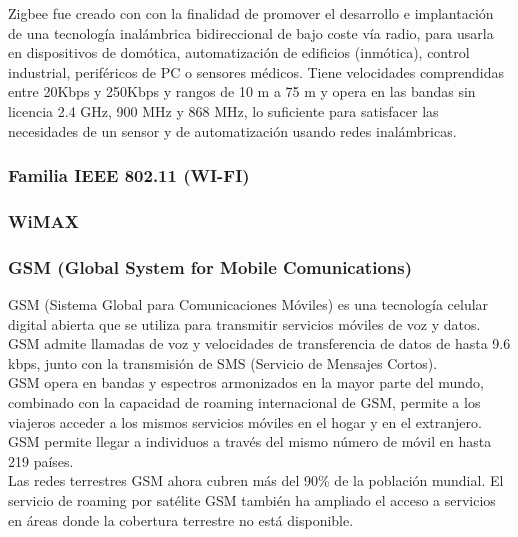 	Zigbee fue creado con  con la finalidad de promover el desarrollo e implantación de una tecnología inalámbrica bidireccional de bajo coste vía radio, para usarla en dispositivos de domótica, automatización de edificios (inmótica), control industrial, periféricos de PC o sensores médicos.  Tiene velocidades comprendidas entre 20Kbps y 250Kbps y rangos de 10 m a 75 m y opera en las bandas sin licencia 2.4 GHz, 900 MHz y 868 MHz, lo suficiente para satisfacer las necesidades de un sensor y de automatización usando redes inalámbricas.
	
	\subsubsection{Familia IEEE 802.11 (WI-FI)}
	
	
	\subsubsection{WiMAX}
	
	
	\subsubsection{GSM (Global System for Mobile Comunications)}
	GSM (Sistema Global para Comunicaciones Móviles) es una tecnología celular digital abierta que se utiliza para transmitir servicios móviles de voz y datos. GSM admite llamadas de voz y velocidades de transferencia de datos de hasta 9.6 kbps, junto con la transmisión de SMS (Servicio de Mensajes Cortos). \\

GSM opera en bandas y espectros armonizados en la mayor parte del mundo, combinado con la capacidad de roaming internacional de GSM, permite a los viajeros acceder a los mismos servicios móviles en el hogar y en el extranjero. GSM permite llegar a individuos a través del mismo número de móvil en hasta 219 países. \\

Las redes terrestres GSM ahora cubren más del 90\% de la población mundial. El servicio de roaming por satélite GSM también ha ampliado el acceso a servicios en áreas donde la cobertura terrestre no está disponible.

	